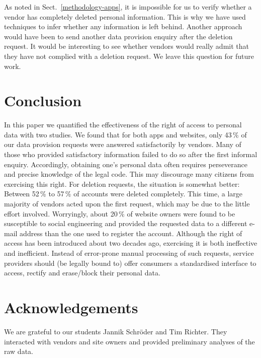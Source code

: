 \documentclass{llncs}
\begin{document}
As noted in Sect.~\ref{methodology-apps}, it is impossible for us to verify whether a vendor has completely deleted personal information. This is why we have used techniques to infer whether any information is left behind. Another approach would have been to send another data provision enquiry after the deletion request. It would be interesting to see whether vendors would really admit that they have not complied with a deletion request. We leave this question for future work.

\section{Conclusion}

In this paper we quantified the effectiveness of the right of access to personal data with two studies. We found that for both apps and websites, only 43\,\% of our data provision requests were answered satisfactorily by vendors. Many of those who provided satisfactory information failed to do so after the first informal enquiry. Accordingly, obtaining one's personal data often requires perseverance and precise knowledge of the legal code. This may discourage many citizens from exercising this right. For deletion requests, the situation is somewhat better: Between 52\,\% to 57\,\% of accounts were deleted completely. This time, a large majority of vendors acted upon the first request, which may be due to the little effort involved. Worryingly, about 20\,\% of website owners were found to be susceptible to social engineering and provided the requested data to a different e-mail address than the one used to register the account. Although the right of access has been introduced about two decades ago, exercising it is both ineffective and inefficient. Instead of error-prone manual processing of such requests, service providers should (be legally bound to) offer consumers a standardised interface to access, rectify and erase/block their personal data.

\section*{Acknowledgements}

We are grateful to our students Jannik Schröder and Tim Richter. They interacted with vendors and site owners and provided preliminary analyses of the raw data.




\clearpage
\end{document}
